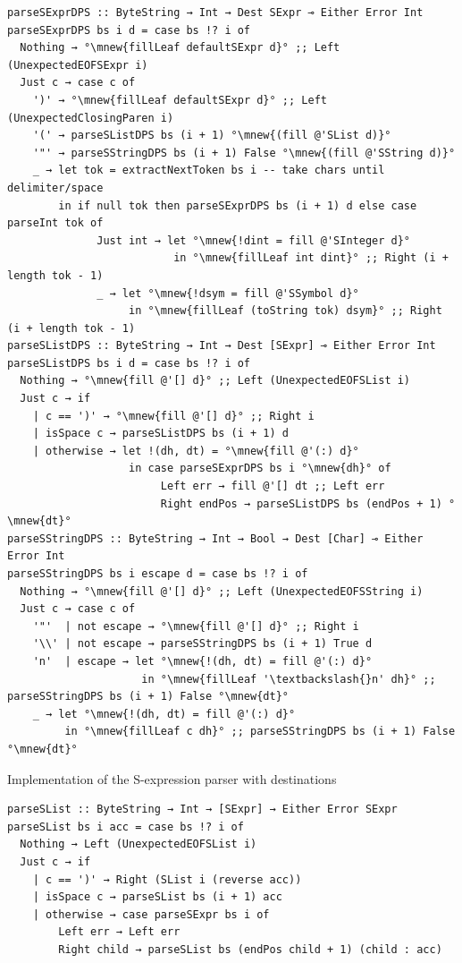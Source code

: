 \documentclass[english]{jflart}
\newcommand{\mnew}[1]{\colorbox{green}{#1}}
\begin{document}
\begin{table}[t]
\small
\begin{verbatim}
parseSExprDPS :: ByteString → Int → Dest SExpr ⊸ Either Error Int
parseSExprDPS bs i d = case bs !? i of
  Nothing → °\mnew{fillLeaf defaultSExpr d}° ;; Left (UnexpectedEOFSExpr i)
  Just c → case c of
    ')' → °\mnew{fillLeaf defaultSExpr d}° ;; Left (UnexpectedClosingParen i)
    '(' → parseSListDPS bs (i + 1) °\mnew{(fill @'SList d)}°
    '"' → parseSStringDPS bs (i + 1) False °\mnew{(fill @'SString d)}°
    _ → let tok = extractNextToken bs i -- take chars until delimiter/space
        in if null tok then parseSExprDPS bs (i + 1) d else case parseInt tok of
              Just int → let °\mnew{!dint = fill @'SInteger d}°
                          in °\mnew{fillLeaf int dint}° ;; Right (i + length tok - 1)
              _ → let °\mnew{!dsym = fill @'SSymbol d}°
                   in °\mnew{fillLeaf (toString tok) dsym}° ;; Right (i + length tok - 1)
parseSListDPS :: ByteString → Int → Dest [SExpr] ⊸ Either Error Int
parseSListDPS bs i d = case bs !? i of
  Nothing → °\mnew{fill @'[] d}° ;; Left (UnexpectedEOFSList i)
  Just c → if
    | c == ')' → °\mnew{fill @'[] d}° ;; Right i
    | isSpace c → parseSListDPS bs (i + 1) d
    | otherwise → let !(dh, dt) = °\mnew{fill @'(:) d}°
                   in case parseSExprDPS bs i °\mnew{dh}° of
                        Left err → fill @'[] dt ;; Left err
                        Right endPos → parseSListDPS bs (endPos + 1) °\mnew{dt}°
parseSStringDPS :: ByteString → Int → Bool → Dest [Char] ⊸ Either Error Int
parseSStringDPS bs i escape d = case bs !? i of
  Nothing → °\mnew{fill @'[] d}° ;; Left (UnexpectedEOFSString i)
  Just c → case c of
    '"'  | not escape → °\mnew{fill @'[] d}° ;; Right i
    '\\' | not escape → parseSStringDPS bs (i + 1) True d
    'n'  | escape → let °\mnew{!(dh, dt) = fill @'(:) d}°
                     in °\mnew{fillLeaf '\textbackslash{}n' dh}° ;; parseSStringDPS bs (i + 1) False °\mnew{dt}°
    _ → let °\mnew{!(dh, dt) = fill @'(:) d}°
         in °\mnew{fillLeaf c dh}° ;; parseSStringDPS bs (i + 1) False °\mnew{dt}°
\end{verbatim}
\caption{Implementation of the S-expression parser with destinations}
\label{table:impl-sexpr-parser-with-dest}
\end{table}

{\small
\begin{verbatim}
parseSList :: ByteString → Int → [SExpr] → Either Error SExpr
parseSList bs i acc = case bs !? i of
  Nothing → Left (UnexpectedEOFSList i)
  Just c → if
    | c == ')' → Right (SList i (reverse acc))
    | isSpace c → parseSList bs (i + 1) acc
    | otherwise → case parseSExpr bs i of
        Left err → Left err
        Right child → parseSList bs (endPos child + 1) (child : acc)
\end{verbatim}
}
\end{document}
